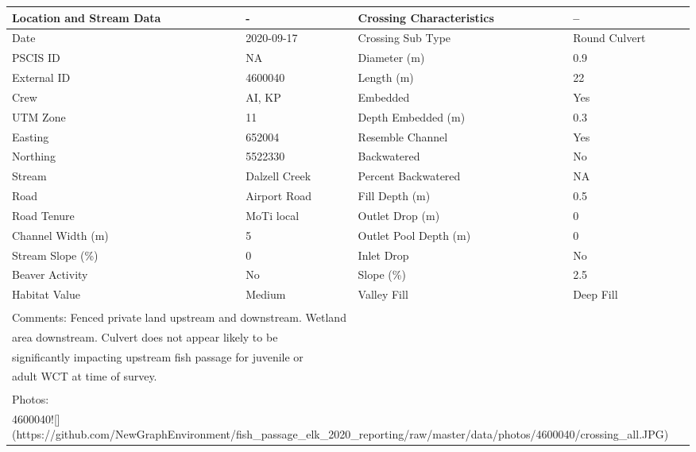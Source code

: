 \documentclass[
]{book}
\begin{document}
\begin{tabular}{l|l|l|l}
\hline
Location and Stream Data & - & Crossing Characteristics & --\\
\hline
Date & 2020-09-17 & Crossing Sub Type & Round Culvert\\
\hline
PSCIS ID & NA & Diameter (m) & 0.9\\
\hline
External ID & 4600040 & Length (m) & 22\\
\hline
Crew & AI, KP & Embedded & Yes\\
\hline
UTM Zone & 11 & Depth Embedded (m) & 0.3\\
\hline
Easting & 652004 & Resemble Channel & Yes\\
\hline
Northing & 5522330 & Backwatered & No\\
\hline
Stream & Dalzell Creek & Percent Backwatered & NA\\
\hline
Road & Airport Road & Fill Depth (m) & 0.5\\
\hline
Road Tenure & MoTi local & Outlet Drop (m) & 0\\
\hline
Channel Width (m) & 5 & Outlet Pool Depth (m) & 0\\
\hline
Stream Slope (\%) & 0 & Inlet Drop & No\\
\hline
Beaver Activity & No & Slope (\%) & 2.5\\
\hline
Habitat Value & Medium & Valley Fill & Deep Fill\\
\hline
\multicolumn{4}{l}{\textsuperscript{} Comments: Fenced private land upstream and downstream. Wetland}\\
\multicolumn{4}{l}{area downstream.  Culvert does not appear likely to be}\\
\multicolumn{4}{l}{significantly impacting upstream fish passage for juvenile or}\\
\multicolumn{4}{l}{adult WCT at time of survey.}\\
\multicolumn{4}{l}{\textsuperscript{} Photos:}\\
\multicolumn{4}{l}{4600040![](https://github.com/NewGraphEnvironment/fish\_passage\_elk\_2020\_reporting/raw/master/data/photos/4600040/crossing\_all.JPG)}\\
\end{tabular}
\end{document}
